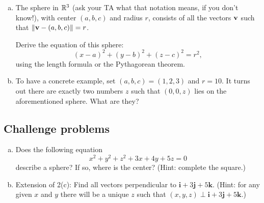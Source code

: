 \documentclass[11pt,oneside]{amsart}
\theoremstyle{definition}
\begin{document}
  \begin{problem}\leavevmode
    \begin{enumerate}[(a)]
      \item The sphere in $\mathbb R^3$ (ask your TA what that notation means, if you don't know!), with center $(a,b,c)$ and radius $r$, consists of all the vectors $\mathbf v$ such that $\|\mathbf v-(a,b,c)\|=r$.

      Derive the equation of this sphere:
      \[(x-a)^2+(y-b)^2+(z-c)^2=r^2,\]
      using the length formula or the Pythagorean theorem.
      \item To have a concrete example, set $(a,b,c)=(1,2,3)$ and $r=10$. It turns out there are exactly two numbers $z$ such that $(0,0,z)$ lies on the aforementioned sphere. What are they?
    \end{enumerate}
  \end{problem}

  \subsection*{Challenge problems}
  \begin{enumerate}[(a)]
    \item Does the following equation
    \[x^2+y^2+z^2+3x+4y+5z=0\]
    describe a sphere? If so, where is the center? (Hint: complete the square.)
    \item Extension of 2(c): Find all vectors perpendicular to $\mathbf i+3\mathbf j+5\mathbf k$. (Hint: for any given $x$ and $y$ there will be a unique $z$ such that $(x,y,z)\perp \mathbf i+3\mathbf j+5\mathbf k$.)
  \end{enumerate}
\end{document}
